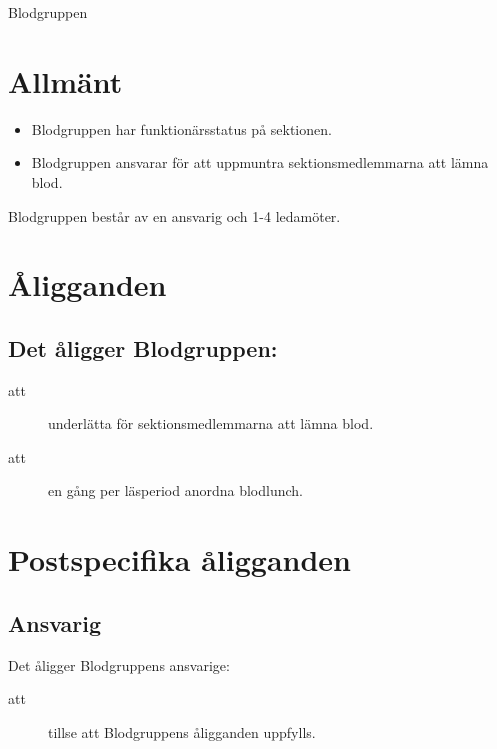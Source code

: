 \documentclass[a4paper]{article}
\begin{document}
\renewcommand{\forening}{Blodgruppen} %

\begin{foreningenv}{\forening{}} %
    \section{Allmänt}
    \begin{itemize}
        \item Blodgruppen har funktionärsstatus på sektionen.
        \item Blodgruppen ansvarar för att uppmuntra sektionsmedlemmarna att lämna blod.
    \end{itemize}
    Blodgruppen består av en ansvarig och 1-4 ledamöter.
    
    
    \section{Åligganden}
    \aliggsektfunkt{} %
        
    \subsection{Det åligger \forening{}:}
    \begin{description}
          \item[att] underlätta för sektionsmedlemmarna att lämna blod.
          \item[att] en gång per läsperiod anordna blodlunch.
    \end{description}
    
    \section{Postspecifika åligganden}
    \subsection{Ansvarig}
    Det åligger Blodgruppens ansvarige:
    \begin{description}
          \item[att] tillse att Blodgruppens åligganden uppfylls.
    \end{description}
\end{foreningenv}
\end{document}
